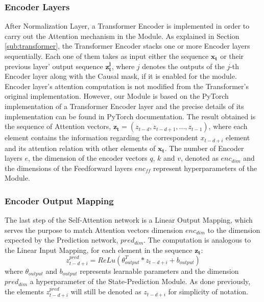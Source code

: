             \subsubsection{Encoder Layers}
                After Normalization Layer, a Transformer Encoder is implemented in order to carry out the Attention mechanism in the Module. As explained in Section \ref{sub:transformer}, the Transformer Encoder stacks one or more Encoder layers sequentially. Each one of them takes as input either the sequence $\mathbf{x_t}$ or their previous layer' output sequence $\mathbf{z_{t}^{j}}$, where $j$ denotes the outputs of the $j$-th Encoder layer along with the Causal mask, if it is enabled for the module. Encoder layer's attention computation is not modified from the Transformer's original implementation. However, our Module is based on the PyTorch implementation of a Transformer Encoder layer and the precise details of its implementation can be found in PyTorch documentation. \newline
                The result obtained is the sequence of Attention vectors, $\mathbf{z_t} = (z_{t-d}, z_{t-d+1}, ..., z_{t-1})$, where each element contains the information regarding the correspondent $x_{t-d+i}$ element and its attention relation with other elements of $\mathbf{x_t}$. The number of Encoder layers $e$, the dimension of the encoder vectors $q$, $k$ and $v$, denoted as $enc_{dim}$ and the dimensions of the Feedforward layers $enc_{ff}$ represent hyperparameters of the Module.
                
            \subsubsection{Encoder Output Mapping}
                The last step of the Self-Attention network is a Linear Output Mapping, which serves the purpose to match Attention vectors dimension $enc_{dim}$ to the dimension expected by the Prediction network, $pred_{dim}$. The computation is analogous to the Linear Input Mapping, for each element in the sequence $\mathbf{z_t}$:
                \[ z^{pred}_{t-d+i} = ReLu \left( \theta_{output}^{T} * z_{t-d+i} + b_{output} \right)\]
                where $\theta_{output}$ and $b_{output}$ represents learnable parameters and the dimension $pred_{dim}$ a hyperparameter of the State-Prediction Module. As done previously, the elements $z^{pred}_{t-d+i}$ will still be denoted as $z_{t-d+i}$ for simplicity of notation.
        

